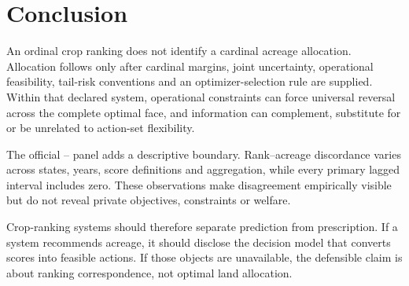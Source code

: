 \section{Conclusion}

An ordinal crop ranking does not identify a cardinal acreage allocation. Allocation follows only after cardinal margins, joint uncertainty, operational feasibility, tail-risk conventions and an optimizer-selection rule are supplied. Within that declared system, operational constraints can force universal reversal across the complete optimal face, and information can complement, substitute for or be unrelated to action-set flexibility.

The official \EmpiricalStartYear--\EmpiricalEndYear{} panel adds a descriptive boundary. Rank--acreage discordance varies across states, years, score definitions and aggregation, while every primary lagged interval includes zero. These observations make disagreement empirically visible but do not reveal private objectives, constraints or welfare.

Crop-ranking systems should therefore separate prediction from prescription. If a system recommends acreage, it should disclose the decision model that converts scores into feasible actions. If those objects are unavailable, the defensible claim is about ranking correspondence, not optimal land allocation.
